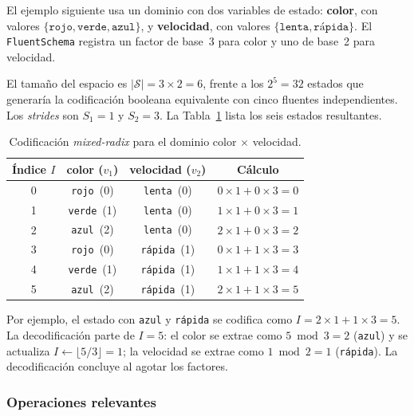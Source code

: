 El ejemplo siguiente usa un dominio con dos variables de estado: \textbf{color},
con valores $\{\texttt{rojo}, \texttt{verde}, \texttt{azul}\}$, y
\textbf{velocidad}, con valores $\{\texttt{lenta}, \texttt{rápida}\}$. El
\texttt{FluentSchema} registra un factor de base~3 para color y uno de base~2
para velocidad.

El tamaño del espacio es $|\mathcal{S}| = 3 \times 2 = 6$, frente a los $2^5 = 32$
estados que generaría la codificación booleana equivalente con cinco fluentes
independientes. Los \textit{strides} son $S_1 = 1$ y $S_2 = 3$. La
Tabla~\ref{tab:mixed-radix-ejemplo} lista los seis estados resultantes.

\begin{table}[ht]
\centering
\caption{Codificación \textit{mixed-radix} para el dominio color $\times$ velocidad.}
\label{tab:mixed-radix-ejemplo}
\begin{tabular}{cccc}
\hline
\textbf{Índice $I$} & \textbf{color ($v_1$)} & \textbf{velocidad ($v_2$)} & \textbf{Cálculo} \\
\hline
0 & \texttt{rojo}\ (0)  & \texttt{lenta}\ (0)  & $0{\times}1 + 0{\times}3 = 0$ \\
1 & \texttt{verde}\ (1) & \texttt{lenta}\ (0)  & $1{\times}1 + 0{\times}3 = 1$ \\
2 & \texttt{azul}\ (2)  & \texttt{lenta}\ (0)  & $2{\times}1 + 0{\times}3 = 2$ \\
3 & \texttt{rojo}\ (0)  & \texttt{rápida}\ (1) & $0{\times}1 + 1{\times}3 = 3$ \\
4 & \texttt{verde}\ (1) & \texttt{rápida}\ (1) & $1{\times}1 + 1{\times}3 = 4$ \\
5 & \texttt{azul}\ (2)  & \texttt{rápida}\ (1) & $2{\times}1 + 1{\times}3 = 5$ \\
\hline
\end{tabular}
\end{table}

Por ejemplo, el estado con \texttt{azul} y \texttt{rápida} se codifica como
$I = 2 \times 1 + 1 \times 3 = 5$. La decodificación parte de $I = 5$: el color
se extrae como $5 \bmod 3 = 2$ (\texttt{azul}) y se actualiza $I \leftarrow
\lfloor 5 / 3 \rfloor = 1$; la velocidad se extrae como $1 \bmod 2 = 1$
(\texttt{rápida}). La decodificación concluye al agotar los factores.

\subsubsection{Operaciones relevantes}
\label{sec:di-fluentschema-ops}

